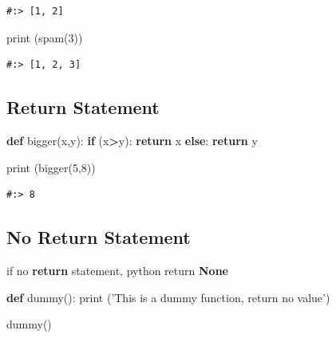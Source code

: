 \documentclass[
]{book}
\newenvironment{Shaded}{\begin{snugshade}}{\end{snugshade}}
\newcommand{\BuiltInTok}[1]{#1}
\newcommand{\ControlFlowTok}[1]{\textcolor[rgb]{0.27,0.27,0.27}{\textbf{#1}}}
\newcommand{\DecValTok}[1]{\textcolor[rgb]{0.06,0.06,0.06}{#1}}
\newcommand{\KeywordTok}[1]{\textcolor[rgb]{0.27,0.27,0.27}{\textbf{#1}}}
\newcommand{\NormalTok}[1]{#1}
\newcommand{\OperatorTok}[1]{\textcolor[rgb]{0.43,0.43,0.43}{\textbf{#1}}}
\newcommand{\StringTok}[1]{\textcolor[rgb]{0.5,0.5,0.5}{#1}}
\begin{document}
\begin{verbatim}
#:> [1, 2]
\end{verbatim}

\begin{Shaded}
\begin{Highlighting}[]
\BuiltInTok{print}\NormalTok{ (spam(}\DecValTok{3}\NormalTok{))}
\end{Highlighting}
\end{Shaded}

\begin{verbatim}
#:> [1, 2, 3]
\end{verbatim}

\hypertarget{return-statement}{%
\subsection{Return Statement}\label{return-statement}}

\begin{Shaded}
\begin{Highlighting}[]
\KeywordTok{def}\NormalTok{ bigger(x,y):}
    \ControlFlowTok{if}\NormalTok{ (x}\OperatorTok{>}\NormalTok{y):}
        \ControlFlowTok{return}\NormalTok{ x}
    \ControlFlowTok{else}\NormalTok{:}
        \ControlFlowTok{return}\NormalTok{ y}
    
\BuiltInTok{print}\NormalTok{ (bigger(}\DecValTok{5}\NormalTok{,}\DecValTok{8}\NormalTok{))}
\end{Highlighting}
\end{Shaded}

\begin{verbatim}
#:> 8
\end{verbatim}

\hypertarget{no-return-statement}{%
\subsection{No Return Statement}\label{no-return-statement}}

if no \textbf{return} statement, python return \textbf{None}

\begin{Shaded}
\begin{Highlighting}[]
\KeywordTok{def}\NormalTok{ dummy():}
    \BuiltInTok{print}\NormalTok{ (}\StringTok{'This is a dummy function, return no value'}\NormalTok{)}

\NormalTok{dummy()}
\end{Highlighting}
\end{Shaded}
\end{document}
